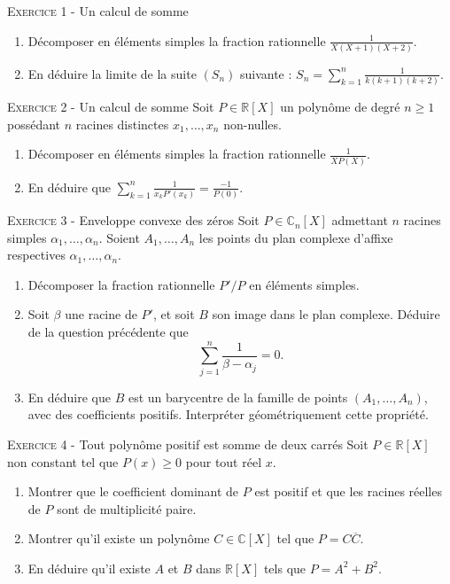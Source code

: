 \documentclass[11pt]{article}
\begin{document}
 

\begin{center}\textsc{{\huge }}\end{center}



\vskip0.3cm\noindent\textsc{Exercice 1} - Un calcul de somme
\vskip0.2cm
\begin{enumerate}
\item Décomposer en éléments simples la fraction rationnelle $\displaystyle\frac{1}{X(X+1)(X+2)}$.
\item En déduire la limite de la suite $(S_n)$ suivante : $\displaystyle S_n=\sum_{k=1}^n \frac{1}{k(k+1)(k+2)}$.
\end{enumerate}




\vskip0.3cm\noindent\textsc{Exercice 2} - Un calcul de somme
\vskip0.2cm
Soit $P\in\mathbb R[X]$ un polynôme de degré $n\geq 1$ possédant $n$ racines distinctes $x_1,\dots,x_n$ non-nulles.
\begin{enumerate}
\item Décomposer en éléments simples la fraction rationnelle $\displaystyle \frac1{XP(X)}$.
\item En déduire que $\displaystyle\sum_{k=1}^n \frac{1}{x_k P'(x_k)}=\frac{-1}{P(0)}$.
\end{enumerate}





\vskip0.3cm\noindent\textsc{Exercice 3} - Enveloppe convexe des zéros
\vskip0.2cm
Soit $P\in\mathbb C_n[X]$ admettant $n$ racines simples $\alpha_1,\dots,\alpha_n$.
Soient $A_1,\dots,A_n$ les points du plan complexe d'affixe respectives $\alpha_1,\dots,\alpha_n$.
\begin{enumerate}
\item Décomposer la fraction rationnelle $P'/P$ en éléments simples.
\item Soit $\beta$ une racine de $P'$, et soit $B$ son image dans le plan complexe. Déduire de la question précédente que 
$$\sum_{j=1}^n \frac{1}{\beta-\alpha_j}=0.$$
\item En déduire que $B$ est un barycentre de la famille de points $(A_1,\dots,A_n)$, avec des coefficients positifs.
Interpréter géométriquement cette propriété.
\end{enumerate}




\vskip0.3cm\noindent\textsc{Exercice 4} - Tout polynôme positif est somme de deux carrés
\vskip0.2cm
Soit $P\in\mathbb R[X]$ non constant tel que $P(x)\geq 0$ pour tout réel $x$.
\begin{enumerate}
 \item Montrer que le coefficient dominant de $P$ est positif et que les racines réelles de $P$ sont de multiplicité paire.
 \item Montrer qu'il existe un polynôme $C\in\mathbb C[X]$ tel que $P=C\overline{C}$.
 \item En déduire qu'il existe $A$ et $B$ dans $\mathbb R[X]$ tels que $P=A^2+B^2$.
\end{enumerate}
\end{document}
